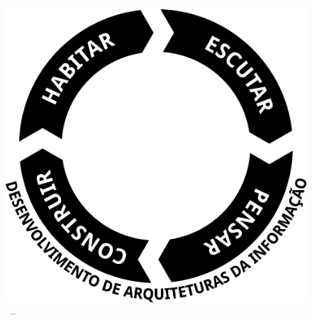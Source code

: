 \begin{figure}[h!]
    \centering
    \caption[MAIA]{\MAIA\ -- \maia} \label{fig:maia}
    \includegraphics[width=0.4\linewidth,frame=0.5pt 5pt]{img/maia}
\end{figure}

\lipsum[2-3]

\lipsum[5-8]
